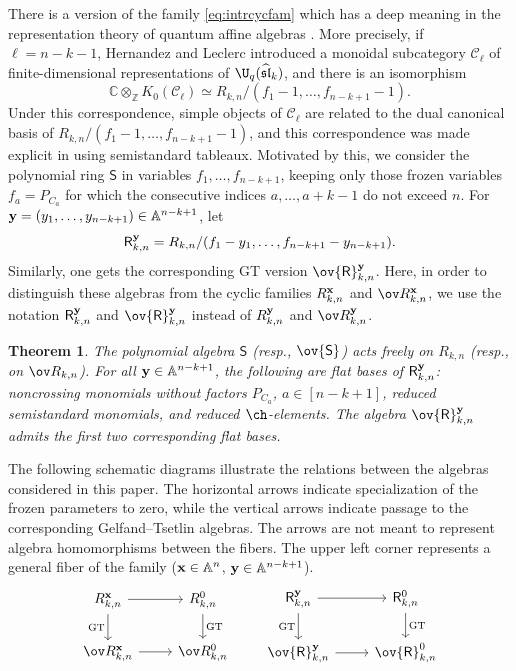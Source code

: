 \documentclass[11pt]{amsart}
\numberwithin{equation}{section}
\newtheorem{theoremA}{Theorem}
\newcommand{\bC}{{\mathbb C}}
\newcommand{\bZ}{{\mathbb Z}}
\newcommand{\bA}{{\mathbb A}}
\newcommand{\bfx}{{\bf x}}
\newcommand{\bfy}{{\bf y}}
\begin{document}
There is a version of the family \eqref{eq:intrcycfam} which has a deep meaning in the 
representation theory of quantum affine algebras \cite{HL10,CDFL20}. More precisely, 
if $\ell=n-k-1$, Hernandez and
Leclerc introduced a monoidal subcategory $\mathcal C_\ell$ of
finite-dimensional representations of
$\U_q(\widehat{\mathfrak{sl}}_k)$, and there is an isomorphism
\[
\bC\otimes_{\bZ}K_0(\mathcal C_\ell)
\simeq
R_{k,n}/(f_1-1,\ldots,f_{n-k+1}-1).
\]
Under this correspondence, simple objects of $\mathcal C_\ell$ are
related to the dual canonical basis of
$R_{k,n}/(f_1-1,\ldots,f_{n-k+1}-1)$, and this correspondence was
made explicit in \cite{CDFL20} using semistandard tableaux. Motivated by this, 
we consider the polynomial ring ${\mathsf S}$ in variables
$f_1,\ldots,f_{n-k+1}$, keeping only those frozen variables
$f_a=P_{C_a}$ for which the consecutive indices
$a,\ldots,a+k-1$ do not exceed $n$. 
For $\bfy = (y_1,\dots, y_{n-k+1})\in \bA^{n-k+1}$, let 
\[
{\mathsf R}^\bfy_{k,n} = R_{k,n}/(f_1-y_1,\dots,f_{n-k+1}-y_{n-k+1}).  
\]
Similarly, one gets the corresponding GT version $\ov {\mathsf R}^\bfy_{k,n}$. Here, in order to distinguish these algebras from the cyclic families
$R_{k,n}^{\bfx}$ and $\ov R_{k,n}^{\bfx}$, we use the notation
${\mathsf R}_{k,n}^{\bfy}$ and $\ov{\mathsf R}_{k,n}^{\bfy}$ instead of
$R_{k,n}^{\bfy}$ and $\ov R_{k,n}^{\bfy}$.

\begin{theoremA}
The polynomial algebra ${\mathsf S}$ (resp., $\ov{\mathsf S}$)
acts freely on $R_{k,n}$ (resp., on $\ov R_{k,n}$).
For all $\bfy\in\bA^{n-k+1}$, the following are flat bases of
${\mathsf R}_{k,n}^{\bfy}$: noncrossing monomials without
factors $P_{C_a}$, $a\in[n-k+1]$, reduced semistandard
monomials, and reduced $\ch$-elements.
The algebra $\ov{\mathsf R}_{k,n}^{\bfy}$ admits the first two
corresponding flat bases.
\end{theoremA}

The following schematic diagrams illustrate the relations
between the algebras considered in this paper.
The horizontal arrows indicate specialization of the
frozen parameters to zero, while the vertical arrows
indicate passage to the corresponding Gelfand--Tsetlin
algebras. The arrows are not meant to represent
algebra homomorphisms between the fibers. The upper left corner represents a general fiber of the family
($\bfx\in\bA^n$, $\bfy\in\bA^{n-k+1}$).
\[
\begin{tikzcd}
R^\bfx_{k,n} \arrow[r] \arrow[d, "\mathrm{GT}"'] & R^0_{k,n} \arrow[d, "\mathrm{GT}"',swap] \\
\ov R^\bfx_{k,n} \arrow[r]           & \ov R^0_{k,n}
\end{tikzcd}\qquad
\begin{tikzcd}
{\mathsf R}^\bfy_{k,n} \arrow[r] \arrow[d, "\mathrm{GT}"'] & {\mathsf R}^0_{k,n} \arrow[d, "\mathrm{GT}"',swap] \\
\ov {\mathsf R}^\bfy_{k,n} \arrow[r]           & \ov {\mathsf R}^0_{k,n}
\end{tikzcd}
\]
\end{document}
